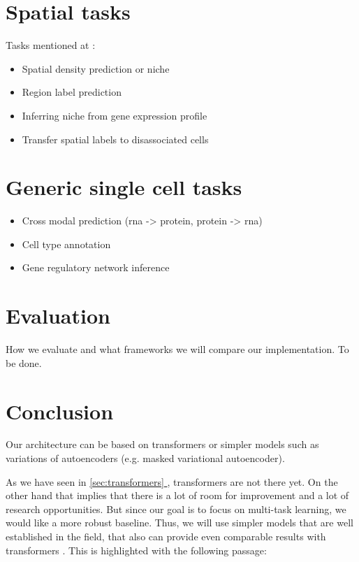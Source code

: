\documentclass[12pt, a4paper]{article}
\newcommand*{\fullref}[1]{\hyperref[{#1}]{\ref*{#1} \nameref*{#1}}}
\begin{document}
\section{Spatial tasks}

Tasks mentioned at \cite{schaarNicheformerFoundationModel}:

\begin{itemize}
  \item Spatial density prediction or niche 
  \item Region label prediction 
  \item Inferring niche from gene expression profile
  \item Transfer spatial labels to disassociated cells
\end{itemize}

\section{Generic single cell tasks}

\begin{itemize}
  \item Cross modal prediction (rna -> protein, protein -> rna)
  \item Cell type annotation
  \item Gene regulatory network inference
\end{itemize}

\section{Evaluation}

How we evaluate and what frameworks we will compare our implementation. To be done.

\clearpage

\section{Conclusion}

Our architecture can be based on transformers or simpler models such as variations of autoencoders (e.g. masked variational autoencoder).

As we have seen in \fullref{sec:transformers}, transformers are not there yet. On the other hand that implies that there is a lot of room for improvement and a lot of research opportunities. But since our goal is to focus on multi-task learning, we would like a more robust baseline. Thus, we will use simpler models that are well established in the field, that also can provide even comparable results with transformers \cite{szalataTransformersSinglecellOmics2024}. This is highlighted with the following passage:
\end{document}
